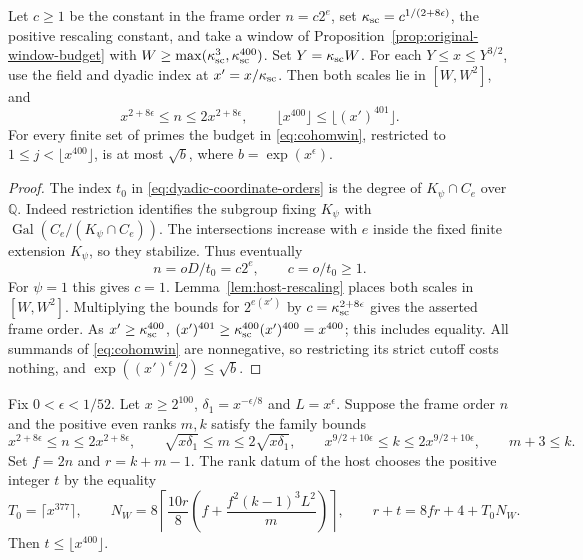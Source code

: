 \begin{lemma}\label{lem:rescale-host-budget}
Let \(c\ge1\) be the constant in the frame order \(n=c2^e\),
set \(\kappa_{\rm sc}=c^{1/(2+8\epsilon)}\), the positive rescaling constant, and take a window of
Proposition~\ref{prop:original-window-budget} with
\(W\ge\max(\kappa_{\rm sc}^3,\kappa_{\rm sc}^{400})\). Set \(Y=\kappa_{\rm sc}W\).
For each \(Y\le x\le Y^{3/2}\), use the field and dyadic index
at \(x'=x/\kappa_{\rm sc}\). Then both scales lie in \([W,W^2]\), and
\[
 x^{2+8\epsilon}\le n\le 2x^{2+8\epsilon},\qquad
 \lfloor x^{400}\rfloor\le \lfloor(x')^{401}\rfloor .
\]
For every finite set of primes the budget in \eqref{eq:cohomwin},
restricted to \(1\le j<\lfloor x^{400}\rfloor\), is at most
\(\sqrt b\), where \(b=\exp(x^\epsilon)\).
\end{lemma}

\begin{proof}
The index \(t_0\) in \eqref{eq:dyadic-coordinate-orders} is the degree
of \(K_\psi\cap C_e\) over \(\mathbb Q\). Indeed restriction
identifies the subgroup fixing \(K_\psi\) with
\(\operatorname{Gal}(C_e/(K_\psi\cap C_e))\). The intersections
increase with \(e\) inside the fixed finite extension \(K_\psi\),
so they stabilize. Thus eventually
\[
           n=oD/t_0=c2^e,\qquad c=o/t_0\ge1 .
\]
For \(\psi=1\) this gives \(c=1\). Lemma~\ref{lem:host-rescaling}
places both scales in \([W,W^2]\).
Multiplying the bounds for \(2^{e(x')}\) by \(c=\kappa_{\rm sc}^{2+8\epsilon}\)
gives the asserted frame order. As \(x'\ge \kappa_{\rm sc}^{400}\),
\((x')^{401}\ge \kappa_{\rm sc}^{400}(x')^{400}=x^{400}\); this includes equality.
All summands of \eqref{eq:cohomwin} are nonnegative, so restricting
its strict cutoff costs nothing, and \(\exp((x')^\epsilon/2)\le\sqrt b\).

\end{proof}

\begin{lemma}
\label{lem:rank-window}
Fix \(0<\epsilon<1/52\). Let \(x\ge 2^{100}\),
\(\delta_1=x^{-\epsilon/8}\) and \(L=x^\epsilon\). Suppose
the frame order \(n\) and the positive even ranks \(m,k\)
satisfy the family bounds
\[
 x^{2+8\epsilon}\le n\le 2x^{2+8\epsilon},\qquad
 \sqrt{x\delta_1}\le m\le 2\sqrt{x\delta_1},\qquad
 x^{9/2+10\epsilon}\le k\le 2x^{9/2+10\epsilon},\qquad m+3\le k.
\]
Set \(f=2n\) and \(r=k+m-1\). The rank datum of the host
chooses the positive integer \(t\) by the equality
\[
 T_0=\lceil x^{377}\rceil,\qquad
 N_W=8\left\lceil\frac{10r}{8}
           \left(f+\frac{f^2(k-1)^3L^2}{m}\right)\right\rceil,
 \qquad r+t=8fr+4+T_0N_W .
\]
Then \(t\le\lfloor x^{400}\rfloor\).
\end{lemma}

